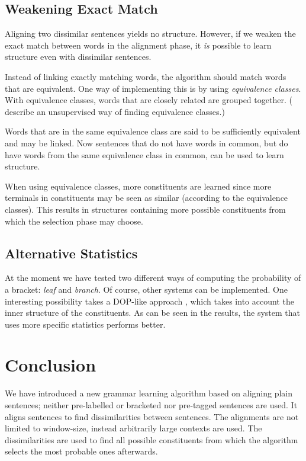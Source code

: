 \documentclass[letterpaper,mlapa]{article}
\begin{document}
\subsection{Weakening Exact Match}

Aligning two dissimilar sentences yields no structure. However, if we weaken
the exact match between words in the alignment phase, it \emph{is} possible to
learn structure even with dissimilar sentences.

Instead of linking exactly matching words, the algorithm should match words
that are equivalent. One way of implementing this is by using \emph{equivalence
classes}. With equivalence classes, words that are closely related are grouped
together. ( describe an unsupervised way of finding
equivalence classes.)

Words that are in the same equivalence class are said to be sufficiently
equivalent and may be linked. Now sentences that do not have words in common,
but do have words from the same equivalence class in common, can be used to
learn structure.

When using equivalence classes, more constituents are learned since more
terminals in constituents may be seen as similar (according to the equivalence
classes). This results in structures containing more possible constituents from
which the selection phase may choose.


\subsection{Alternative Statistics}

At the moment we have tested two different ways of computing the probability of
a bracket: \emph{leaf} and \emph{branch}. Of course, other systems can be
implemented. One interesting possibility takes a DOP-like approach
\cite{bib:bgaebtol}, which takes into account the inner structure of the
constituents. As can be seen in the results, the system that uses more
specific statistics performs better.


\section{Conclusion}

We have introduced a new grammar learning algorithm based on aligning plain
sentences; neither pre-labelled or bracketed nor pre-tagged sentences are used.
It aligns sentences to find dissimilarities between sentences. The alignments
are not limited to window-size, instead arbitrarily large contexts are used.
The dissimilarities are used to find all possible constituents from which the
algorithm selects the most probable ones afterwards.
\end{document}
